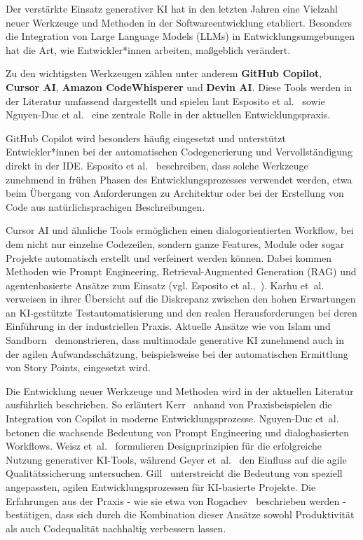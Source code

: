 Der verstärkte Einsatz generativer KI hat in den letzten Jahren eine Vielzahl
neuer Werkzeuge und Methoden in der Softwareentwicklung etabliert. Besonders
die Integration von Large Language Models (LLMs) in Entwicklungsumgebungen hat
die Art, wie Entwickler*innen arbeiten, maßgeblich verändert.

Zu den wichtigsten Werkzeugen zählen unter anderem \textbf{GitHub Copilot},
\textbf{Cursor AI}, \textbf{Amazon CodeWhisperer} und \textbf{Devin AI}. Diese
Tools werden in der Literatur umfassend dargestellt und spielen laut Esposito
et al.~\cite{esposito_generative_2025} sowie Nguyen-Duc et
al.~\cite{duc_generative_2023} eine zentrale Rolle in der aktuellen
Entwicklungspraxis.

GitHub Copilot wird besonders häufig eingesetzt und unterstützt
Entwickler*innen bei der automatischen Codegenerierung und Vervollständigung
direkt in der IDE. Esposito et al.~\cite[S.~2]{esposito_generative_2025}
beschreiben, dass solche Werkzeuge zunehmend in frühen Phasen des
Entwicklungsprozesses verwendet werden, etwa beim Übergang von Anforderungen zu
Architektur oder bei der Erstellung von Code aus natürlichsprachigen
Beschreibungen.

Cursor AI und ähnliche Tools ermöglichen einen dialogorientierten Workflow, bei
dem nicht nur einzelne Codezeilen, sondern ganze Features, Module oder sogar
Projekte automatisch erstellt und verfeinert werden können. Dabei kommen
Methoden wie Prompt Engineering, Retrieval-Augmented Generation (RAG) und
agentenbasierte Ansätze zum Einsatz (vgl. Esposito et
al.,~\cite[S.~3--4]{esposito_generative_2025}). Karhu
et~al.~\cite{karhu_expectations_2025} verweisen in ihrer Übersicht auf die
Diskrepanz zwischen den hohen Erwartungen an KI-gestützte Testautomatisierung
und den realen Herausforderungen bei deren Einführung in der industriellen
Praxis. Aktuelle Ansätze wie von Islam und
Sandborn~\cite{islam_multimodal_2025} demonstrieren, dass multimodale
generative KI zunehmend auch in der agilen Aufwandsschätzung, beispielsweise
bei der automatischen Ermittlung von Story Points, eingesetzt wird.

Die Entwicklung neuer Werkzeuge und Methoden wird in der aktuellen Literatur
ausführlich beschrieben. So erläutert Kerr~\cite{kerr_github_nodate} anhand von
Praxisbeispielen die Integration von Copilot in moderne Entwicklungsprozesse.
Nguyen-Duc et~al.~\cite{nguyen-duc_generative_2023} betonen die wachsende
Bedeutung von Prompt Engineering und dialogbasierten Workflows. Weisz
et~al.~\cite{weisz_design_2024} formulieren Designprinzipien für die
erfolgreiche Nutzung generativer KI-Tools, während Geyer
et~al.~\cite{geyer_case_2025} den Einfluss auf die agile Qualitätssicherung
untersuchen. Gill~\cite{gill_agile_2025} unterstreicht die Bedeutung von
speziell angepassten, agilen Entwicklungsprozessen für KI-basierte Projekte.
Die Erfahrungen aus der Praxis - wie sie etwa von
Rogachev~\cite{rogachev_my_nodate} beschrieben werden - bestätigen, dass sich
durch die Kombination dieser Ansätze sowohl Produktivität als auch Codequalität
nachhaltig verbessern lassen.

